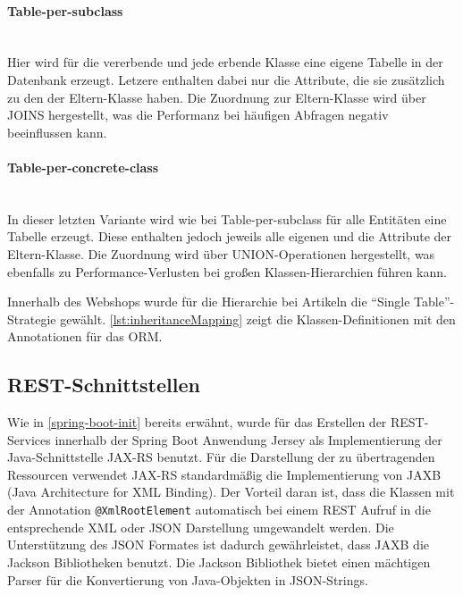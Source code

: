\paragraph{Table-per-subclass}$\;$ \\
Hier wird für die vererbende und jede erbende Klasse eine eigene Tabelle in der Datenbank erzeugt. Letzere enthalten dabei nur die Attribute, die sie zusätzlich zu den der Eltern-Klasse haben. Die Zuordnung zur Eltern-Klasse wird über JOINS hergestellt, was die Performanz bei häufigen Abfragen negativ beeinflussen kann.
\paragraph{Table-per-concrete-class}$\;$ \\
In dieser letzten Variante wird wie bei Table-per-subclass für alle Entitäten eine Tabelle erzeugt. Diese enthalten jedoch jeweils alle eigenen und die Attribute der Eltern-Klasse.
Die Zuordnung wird über UNION-Operationen hergestellt, was ebenfalls zu Performance-Verlusten bei großen Klassen-Hierarchien führen kann.

Innerhalb des Webshops wurde für die Hierarchie bei Artikeln die \enquote{Single Table}-Strategie gewählt.
\cref{lst:inheritanceMapping} zeigt die Klassen-Definitionen mit den Annotationen für das \acs{ORM}.
\\


\subsection{REST-Schnittstellen}
Wie in \cref{spring-boot-init} bereits erwähnt, wurde für das Erstellen der REST-Services innerhalb der Spring Boot Anwendung Jersey als Implementierung der Java-Schnittstelle \acs{JAX-RS} benutzt.
Für die Darstellung der zu übertragenden Ressourcen verwendet JAX-RS standardmäßig die Implementierung von \acs{JAXB} (Java Architecture for XML Binding).
Der Vorteil daran ist, dass die Klassen mit der Annotation \texttt{@XmlRootElement} automatisch bei einem REST Aufruf in die entsprechende XML oder \acs{JSON} Darstellung umgewandelt werden.
Die Unterstützung des JSON Formates ist dadurch gewährleistet, dass JAXB die Jackson Bibliotheken benutzt.
Die Jackson Bibliothek bietet einen mächtigen Parser für die Konvertierung von Java-Objekten in JSON-Strings\cite{Oracle2015}.

